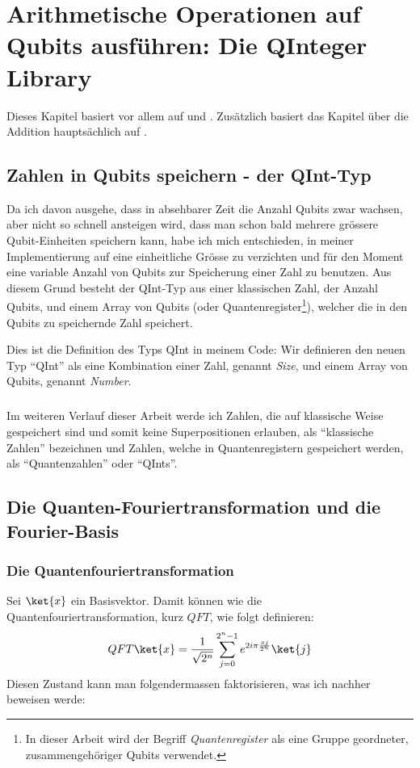 \chapter{Arithmetische Operationen auf Qubits ausführen: Die QInteger Library}
Dieses Kapitel basiert vor allem auf \cite{AROP} und \cite{QC}. Zusätzlich basiert das Kapitel über die Addition hauptsächlich auf \cite{ADFT}.

\section{Zahlen in Qubits speichern - der QInt-Typ}
Da ich davon ausgehe, dass in absehbarer Zeit die Anzahl Qubits zwar wachsen, aber nicht so schnell ansteigen wird, dass man schon bald mehrere grössere Qubit-Einheiten speichern kann, habe ich mich entschieden, in meiner Implementierung auf eine einheitliche Grösse zu verzichten und für den Moment eine variable Anzahl von Qubits zur Speicherung einer Zahl zu benutzen. Aus diesem Grund besteht der QInt-Typ aus einer klassischen Zahl, der Anzahl Qubits, und einem Array von Qubits (oder Quantenregister\footnote{In dieser Arbeit wird der Begriff \textit{Quantenregister} als eine Gruppe geordneter, zusammengehöriger Qubits verwendet.}), welcher die in den Qubits zu speichernde Zahl speichert.



Dies ist die Definition des Typs QInt in meinem Code: Wir definieren den neuen Typ "`QInt"' als eine Kombination einer Zahl, genannt \textit{Size}, und einem Array von Qubits, genannt \textit{Number}.

\paragraph{}

Im weiteren Verlauf dieser Arbeit werde ich Zahlen, die auf klassische Weise gespeichert sind und somit keine Superpositionen erlauben, als "`klassische Zahlen"' bezeichnen und Zahlen, welche in Quantenregistern gespeichert werden, als "`Quantenzahlen"' oder "`QInts"'.

\section{Die Quanten-Fouriertransformation und die Fourier-Basis}
\subsection{Die Quantenfouriertransformation}
Sei $\ket{x}$ ein Basisvektor. Damit können wie die Quantenfouriertransformation, kurz $QFT$, wie folgt definieren:
$$QFT\ket{x} = \frac{1}{\sqrt{2^n}}\sum^{2^n - 1}_{j = 0}e^{2i\pi\frac{xj}{2^n}}\ket{j}$$
Diesen Zustand kann man folgendermassen faktorisieren, was ich nachher beweisen werde:

